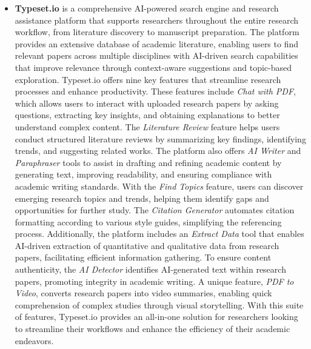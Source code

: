 \begin{itemize}
\item \textbf{Typeset.io} is a comprehensive AI-powered search engine and research assistance platform that supports researchers throughout the entire research workflow, from literature discovery to manuscript preparation. The platform provides an extensive database of academic literature, enabling users to find relevant papers across multiple disciplines with AI-driven search capabilities that improve relevance through context-aware suggestions and topic-based exploration. Typeset.io offers nine key features that streamline research processes and enhance productivity. These features include \textit{Chat with PDF}, which allows users to interact with uploaded research papers by asking questions, extracting key insights, and obtaining explanations to better understand complex content. The \textit{Literature Review} feature helps users conduct structured literature reviews by summarizing key findings, identifying trends, and suggesting related works. The platform also offers \textit{AI Writer} and \textit{Paraphraser} tools to assist in drafting and refining academic content by generating text, improving readability, and ensuring compliance with academic writing standards. With the \textit{Find Topics} feature, users can discover emerging research topics and trends, helping them identify gaps and opportunities for further study. The \textit{Citation Generator} automates citation formatting according to various style guides, simplifying the referencing process. Additionally, the platform includes an \textit{Extract Data} tool that enables AI-driven extraction of quantitative and qualitative data from research papers, facilitating efficient information gathering. To ensure content authenticity, the \textit{AI Detector} identifies AI-generated text within research papers, promoting integrity in academic writing. A unique feature, \textit{PDF to Video}, converts research papers into video summaries, enabling quick comprehension of complex studies through visual storytelling. With this suite of features, Typeset.io provides an all-in-one solution for researchers looking to streamline their workflows and enhance the efficiency of their academic endeavors.
\end{itemize}